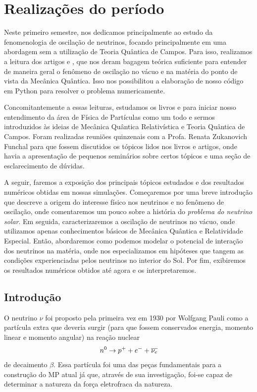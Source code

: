 \documentclass[12pt]{report}
\begin{document}
\pagebreak

\chapter{Realizações do período}\label{chp:realizacoes}

Neste primeiro semestre, nos dedicamos principalmente ao estudo da fenomenologia de oscilação de neutrinos, focando principalmente em uma abordagem sem a utilização de Teoria Quântica de Campos. Para isso, realizamos a leitura dos artigos \cite{gonzalez} e \cite{pizzochero}, que nos deram bagagem teórica suficiente para entender de maneira geral o fenômeno de oscilação no vácuo e na matéria do ponto de vista da Mecânica Quântica. Isso nos possibilitou a elaboração de nosso código em Python para resolver o problema numericamente.

Concomitantemente a essas leituras, estudamos os livros \cite{halzen} e \cite{ideas} para iniciar nosso entendimento da área de Física de Partículas como um todo e sermos introduzidos às ideias de Mecânica Quântica Relativística e Teoria Quântica de Campos. Foram realizadas reuniões quinzenais com a Profa. Renata Zukanovich Funchal para que fossem discutidos os tópicos lidos nos livros e artigos, onde havia a apresentação de pequenos seminários sobre certos tópicos e uma seção de esclarecimento de dúvidas.

A seguir, faremos a exposição dos principais tópicos estudados e dos resultados numéricos obtidas em nossas simulações. Começaremos por uma breve introdução que descreve a origem do interesse físico nos neutrinos e no fenômeno de oscilação, onde comentaremos um pouco sobre a história do \textit{problema do neutrino solar}. Em seguida, caracterizaremos a oscilação de neutrinos no vácuo, onde utilizamos apenas conhecimentos básicos de Mecânica Quântica e Relatividade Especial. Então, abordaremos como podemos modelar o potencial de interação dos neutrinos na matéria, onde nos especializamos em hipóteses que tangem as condições experienciadas pelos neutrinos no interior do Sol. Por fim, exibiremos os resultados numéricos obtidos até agora e os interpretaremos.


\section{Introdução} \label{intro}

O neutrino $\nu$ foi proposto pela primeira vez em 1930 por Wolfgang Pauli como a partícula extra que deveria surgir (para que fossem conservados energia, momento linear e momento angular) na reação nuclear
\begin{equation} \label{eq:beta}
n^0 \to p^+ + e^- + \overline{\nu_e}
\end{equation}
de decaimento $\beta$. Essa partícula foi uma das peças fundamentais para a construção do MP atual já que, através de sua investigação, foi-se capaz de determinar a natureza da força eletrofraca da natureza.
\end{document}
